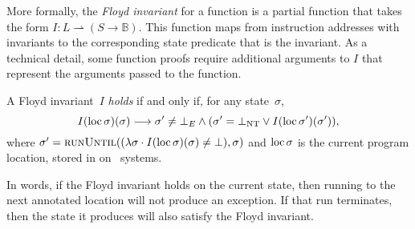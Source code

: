 More formally, the \emph{Floyd invariant}%
for a function is a partial function that takes the form
$I:L\rightharpoonup(S\rightarrow\mathbb{B})$.%
%
This function maps from instruction addresses with invariants
to the corresponding state predicate that is the invariant.
As a technical detail, some function proofs require additional arguments to $I$
that represent the arguments passed to the function.
\begin{definition}\label{def:floyd_inv}
  A Floyd invariant~$I$ \emph{holds} if and only if, for any state~$\sigma$,
  \begin{equation}
    I(\operatorname{loc}\sigma)(\sigma)\longrightarrow
    \sigma'\neq\bot_E\wedge(\sigma'=\bot_\mathrm{NT}\vee I(\operatorname{loc}\sigma')(\sigma')),
  \end{equation}
  where
  $\sigma'=\operatorname{\textsc{runUntil}}((\lambda\sigma\cdot I(\operatorname{loc}\sigma)(\sigma)\neq\bot),\sigma)$%
  and $\operatorname{loc}\sigma$ is the current program location,
  stored in  on \arch\ systems.
\end{definition}
In words, if the Floyd invariant holds on the current state,
then running to the next annotated location will not produce an exception.
If that run terminates, then the state it produces
will also satisfy the Floyd invariant.

